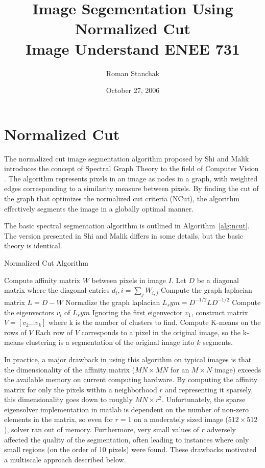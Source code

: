 \documentclass{article}
\title{ Image Segementation Using Normalized Cut\\ Image Understand ENEE 731 }
\author{ Roman Stanchak }
\date{ October 27, 2006 }
\begin{document}
\maketitle
\section{Normalized Cut}
The normalized cut image segmentation algorithm proposed by Shi and Malik introduces the
concept of Spectral Graph Theory to the field of Computer Vision \cite{shi00normalized}.
The algorithm represents pixels in an
image as nodes in a graph, with weighted edges corresponding to a similarity 
measure between pixels.  By finding the cut of the graph that optimizes the normalized cut 
criteria (NCut), the algorithm effectively segments the image in a globally optimal manner. 

The basic spectral segmentation algorithm is outlined in Algorithm~\ref{alg:ncut}.  The version
presented in Shi and Malik differs in some details, but the basic theory is identical.
\begin{algorithm}[htb]
	\caption{Normalized Cut Algorithm}
	\label{alg:ncut}
	\begin{algorithmic}[1]
		\STATE Compute affinity matrix $W$ between pixels in image $I$.
		\STATE Let $D$ be a diagonal matrix where the diagonal entries $d_i,i = \sum_j W_{i,j}$
		\STATE Compute the graph laplacian matrix $L=D-W$
		\STATE Normalize the graph laplacian $L_sym=D^{-1/2}LD^{-1/2}$
		\STATE Compute the eigenvectors $v_i$ of $L_sym$
		\STATE Ignoring the first eigenvector $v_1$, construct matrix $V=[v_2 \dots v_k]$ where
		k is the number of clusters to find. 
		\STATE Compute K-means on the rows of $V$
		\STATE Each row of $V$ corresponds to a pixel in the original image, so the k-means clustering
		is a segmentation of the original image into $k$ segments.
	\end{algorithmic}
\end{algorithm}

In practice, a major drawback in using this algorithm on typical images is 
that the dimensionality of the affinity matrix 
($MN \times MN$ for an $M \times N$ image) exceeds the available memory on 
current computing hardware.  By computing the affinity matrix for only the pixels within
a neighborhood $r$ and representing it sparsely, this dimensionality goes down to
roughly $MN \times r^2$.  Unfortunately, the sparse eigensolver implementation in matlab
is dependent on the number of non-zero elements in the matrix, so even for $r=1$ on a 
moderately sized image ($512\times512$), solver ran out of memory.  
Furthermore, very small values of $r$ adversely affected the quality of the segmentation,
often leading to instances where only small regions (on the order of 10 pixels) were
found.  These drawbacks motivated a multiscale approach described below.
\end{document}

